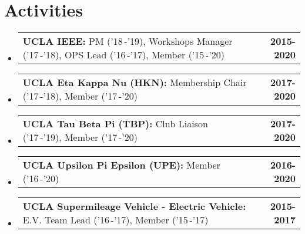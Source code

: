 \documentclass[letterpaper,10.8pt]{article}
\makeatletter
\newcommand{\resumeSubheadingActivityCustom}[3]{
  \vspace{-2pt}\item[$ $]
    \begin{tabular*}{0.97\textwidth}{l@{\extracolsep{\fill}}r}
      \textbf{#1:} #2 & \textbf{\small #3} \\
    \end{tabular*}
  \vspace{-7pt}
}
\newcommand{\resumeSubHeadingListStart}{\begin{itemize}[leftmargin=*]}
\newcommand{\resumeSubHeadingListEnd}{\end{itemize}}
\makeatother
\begin{document}
\section{Activities}
\resumeSubHeadingListStart
    \resumeSubheadingActivityCustom
    {UCLA IEEE}{PM ('18\,-'19), Workshops Manager ('17\,-'18), OPS Lead ('16\,-'17), Member ('15\,-'20)}{2015-2020}

    \resumeSubheadingActivityCustom
    {UCLA Eta Kappa Nu (HKN)}{Membership Chair ('17\,-'18), Member ('17\,-'20)}{2017-2020}

    \resumeSubheadingActivityCustom
    {UCLA Tau Beta Pi (TBP)}{Club Liaison ('17\,-'19), Member ('17\,-'20)}{2017-2020}

    \resumeSubheadingActivityCustom
    {UCLA Upsilon Pi Epsilon (UPE)}{Member ('16\,-'20)} {2016-2020}
    
    \resumeSubheadingActivityCustom
    {UCLA Supermileage Vehicle - Electric Vehicle}{E.V. Team Lead ('16\,-'17), Member ('15\,-'17)} {2015-2017}
    
\resumeSubHeadingListEnd

\end{document}
